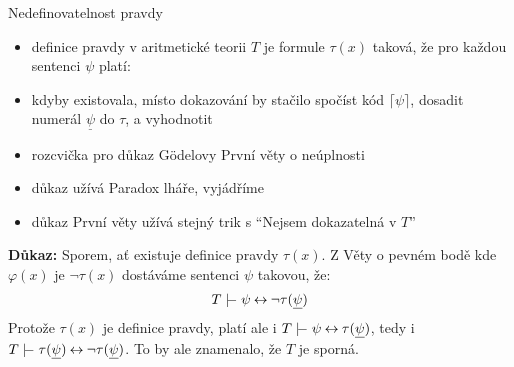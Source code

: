 \documentclass{beamer}
\begin{document}
\begin{frame}{Nedefinovatelnost pravdy}

    \vspace{-12pt}
    \begin{itemize}
        \item \alert{definice pravdy} v aritmetické teorii $T$ je formule $\tau(x)$ taková, že pro každou sentenci $\psi$ platí: 
        \item kdyby existovala, místo dokazování by stačilo spočíst kód $\lceil \psi\rceil$, dosadit numerál $\underline{\psi}$ do $\tau$, a vyhodnotit
        \item rozcvička pro důkaz Gödelovy První věty o neúplnosti
        \item důkaz užívá \alert{Paradox lháře}, vyjádříme 
        \item důkaz První věty užívá stejný trik s ``Nejsem dokazatelná v $T$''
    \end{itemize}
    \vspace{-3pt}
    \textbf{Důkaz:} Sporem, ať existuje definice pravdy $\tau(x)$. Z Věty o pevném bodě kde $\varphi(x)$ je $\neg\tau(x)$ dostáváme sentenci $\psi$ takovou, že:
    $$
    T\proves\psi\liff\neg\tau(\underline{\psi})
    $$
    Protože $\tau(x)$ je definice pravdy, platí ale i $T\proves\psi\liff\tau(\underline{\psi})$, tedy i $T\proves\tau(\underline{\psi})\liff\neg\tau(\underline{\psi})$. To by ale znamenalo, že $T$ je sporná.
    \hfill\qedsymbol
    
\end{frame}
\end{document}

